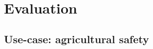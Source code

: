 \documentclass[conference]{IEEEtran}
\begin{document}
%
%    
%    
%    
%
%   

\section{Evaluation}
\label{sec:experimental}


\subsection{Use-case: agricultural safety}
\end{document}
